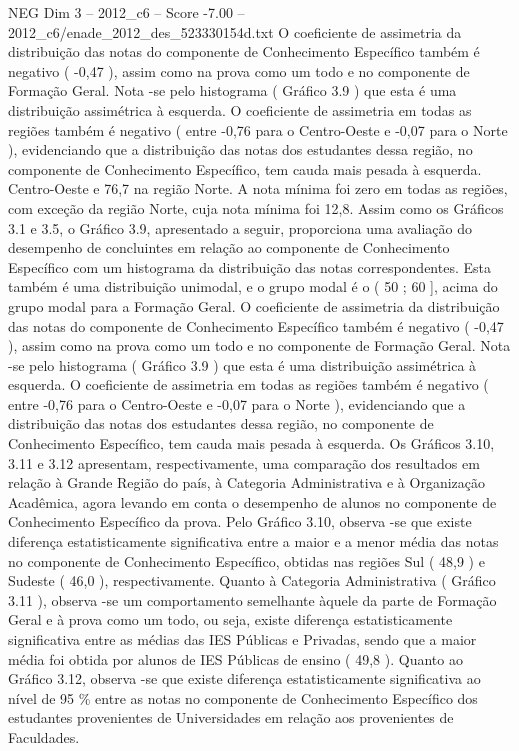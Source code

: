 \begin{textsample}{NEG Dim 3 – 2012\_c6 – Score -7.00 – 2012\_c6/enade\_2012\_des\_523330154d.txt}
O coeficiente de assimetria da distribuição das notas do componente de Conhecimento Específico também é negativo ( -0,47 ), assim como na prova como um todo e no componente de Formação Geral.
Nota -se pelo histograma ( Gráfico 3.9 ) que esta é uma distribuição assimétrica à esquerda.
O coeficiente de assimetria em todas as regiões também é negativo ( entre -0,76 para o Centro-Oeste e -0,07 para o Norte ), evidenciando que a distribuição das notas dos estudantes dessa região, no componente de Conhecimento Específico, tem cauda mais pesada à esquerda.
Centro-Oeste e 76,7 na região Norte.
A nota mínima foi zero em todas as regiões, com exceção da região Norte, cuja nota mínima foi 12,8.
Assim como os Gráficos 3.1 e 3.5, o Gráfico 3.9, apresentado a seguir, proporciona uma avaliação do desempenho de concluintes em relação ao componente de Conhecimento Específico com um histograma da distribuição das notas correspondentes.
Esta também é uma distribuição unimodal, e o grupo modal é o ( 50 ; 60 ], acima do grupo modal para a Formação Geral.
O coeficiente de assimetria da distribuição das notas do componente de Conhecimento Específico também é negativo ( -0,47 ), assim como na prova como um todo e no componente de Formação Geral.
Nota -se pelo histograma ( Gráfico 3.9 ) que esta é uma distribuição assimétrica à esquerda.
O coeficiente de assimetria em todas as regiões também é negativo ( entre -0,76 para o Centro-Oeste e -0,07 para o Norte ), evidenciando que a distribuição das notas dos estudantes dessa região, no componente de Conhecimento Específico, tem cauda mais pesada à esquerda.
Os Gráficos 3.10, 3.11 e 3.12 apresentam, respectivamente, uma comparação dos resultados em relação à Grande Região do país, à Categoria Administrativa e à Organização Acadêmica, agora levando em conta o desempenho de alunos no componente de Conhecimento Específico da prova.
Pelo Gráfico 3.10, observa -se que existe diferença estatisticamente significativa entre a maior e a menor média das notas no componente de Conhecimento Específico, obtidas nas regiões Sul ( 48,9 ) e Sudeste ( 46,0 ), respectivamente.
Quanto à Categoria Administrativa ( Gráfico 3.11 ), observa -se um comportamento semelhante àquele da parte de Formação Geral e à prova como um todo, ou seja, existe diferença estatisticamente significativa entre as médias das IES Públicas e Privadas, sendo que a maior média foi obtida por alunos de IES Públicas de ensino ( 49,8 ).
Quanto ao Gráfico 3.12, observa -se que existe diferença estatisticamente significativa ao nível de 95 \% entre as notas no componente de Conhecimento Específico dos estudantes provenientes de Universidades em relação aos provenientes de Faculdades.

\end{textsample}
